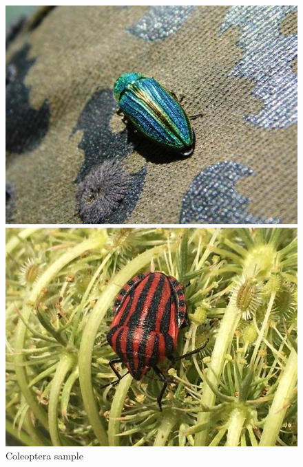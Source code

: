 \begin{figure}[!ht]
    \centering
    \begin{minipage}[t]{.4\textwidth}
        \vspace{0pt}
        \includegraphics[width=\textwidth]{images/00185_Coleoptera_Buprestidae_0a92c2b4-ca55-4f52-850b-3718920d2c9f.jpg}
        \caption{Coleoptera sample}
        \label{fig:coleoptera-sample}
    \end{minipage}
    \hfill
    \begin{minipage}[t]{.4\textwidth}
        \vspace{0pt}
        \includegraphics[width=\textwidth]{images/00624_Hemiptera_Pentatomidae_5ee497cb-1230-4743-b455-49e77bad4eb9.jpg}

\end{minipage}
\end{figure}
